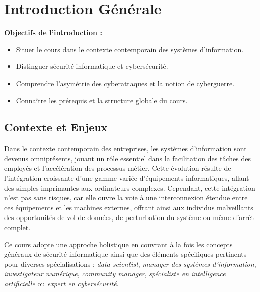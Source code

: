 
\chapter*{Introduction Générale}

\begin{boxobjectifs}
\textbf{Objectifs de l'introduction :}
\begin{itemize}
    \item Situer le cours dans le contexte contemporain des systèmes d'information.
    \item Distinguer sécurité informatique et cybersécurité.
    \item Comprendre l'asymétrie des cyberattaques et la notion de cyberguerre.
    \item Connaître les prérequis et la structure globale du cours.
\end{itemize}
\end{boxobjectifs}

\section*{Contexte et Enjeux}

Dans le contexte contemporain des entreprises, les systèmes d'information sont devenus omniprésents, jouant un rôle essentiel dans la facilitation des tâches des employés et l'accélération des processus métier. Cette évolution résulte de l'intégration croissante d'une gamme variée d'équipements informatiques, allant des simples imprimantes aux ordinateurs complexes. Cependant, cette intégration n'est pas sans risques, car elle ouvre la voie à une interconnexion étendue entre ces équipements et les machines externes, offrant ainsi aux individus malveillants des opportunités de vol de données, de perturbation du système ou même d'arrêt complet.

Ce cours adopte une approche holistique en couvrant à la fois les concepts généraux de sécurité informatique ainsi que des éléments spécifiques pertinents pour diverses spécialisations : \textit{data scientist}, \textit{manager des systèmes d'information}, \textit{investigateur numérique}, \textit{community manager}, \textit{spécialiste en intelligence artificielle} ou \textit{expert en cybersécurité}.

